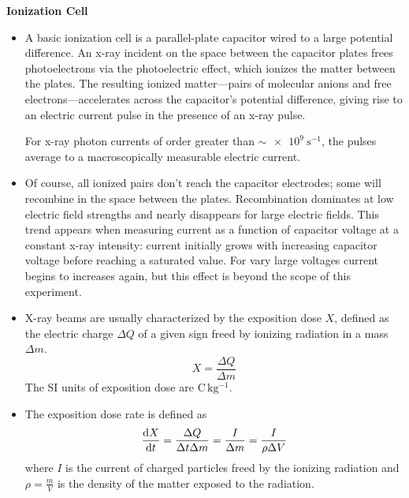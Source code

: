 \documentclass[11pt, a4paper]{article}
\begin{document}
\textbf{Ionization Cell}
\begin{itemize}
	\item A basic ionization cell is a parallel-plate capacitor wired to a large potential difference. An x-ray incident on the space between the capacitor plates frees photoelectrons via the photoelectric effect, which ionizes the matter between the plates. The resulting ionized matter---pairs of molecular anions and free electrons---accelerates across the capacitor's potential difference, giving rise to an electric current pulse in the presence of an x-ray pulse. 
	
	For x-ray photon currents of order greater than $ \sim \SI{e9}{\second^{-1}} $, the pulses average to a macroscopically measurable electric current.
	
	\item  Of course, all ionized pairs don't reach the capacitor electrodes; some will recombine in the space between the plates. Recombination dominates at low electric field strengths and nearly disappears for large electric fields. This trend appears when measuring current as a function of capacitor voltage at a constant x-ray intensity: current initially grows with increasing capacitor voltage before reaching a saturated value. For vary large voltages current begins to increases again, but this effect is beyond the scope of this experiment.
	
	\item X-ray beams are usually characterized by the exposition dose $ X $, defined as the electric charge $ \Delta Q $ of a given sign freed by ionizing radiation in a mass $ \Delta m $. 
	\begin{equation*}
		X = \frac{\Delta Q}{\Delta m}
	\end{equation*}
	The SI units of exposition dose are $ \si{\coulomb \, \kilogram^{-1}} $.
	
	\item The exposition dose rate is defined as
	\begin{equation*}
		\dv{X}{t} = \frac{\Delta Q}{\Delta t \Delta m} = \frac{I}{\Delta m} = \frac{I}{\rho \Delta V}
	\end{equation*}
	where $ I $ is the current of charged particles freed by the ionizing radiation and $ \rho = \frac{m}{V} $ is the density of the matter exposed to the radiation.
	 
\end{itemize}
\end{document}
